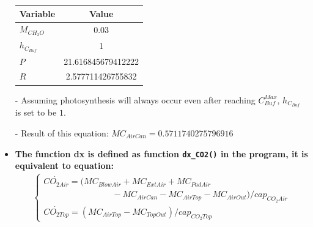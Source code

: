 \documentclass[a4paper]{article}
\numberwithin{equation}{section}
\begin{document}
\begin{itemize}
        \begin{table}[H]
          \centering
          \begin{tabular}{@{}lS[table-format=3.15]@{}}
            \toprule
            \textbf{Variable} & \textbf{Value}     \\
            \midrule
            \(M_{CH_2O}\)     & 0.03               \\
            \(h_{C_{Buf}}\)   & 1                  \\
            \(P\)             & 21.616845679412222 \\
            \(R\)             & 2.577711426755832  \\
            \bottomrule
          \end{tabular}
        \end{table}
  \item[-] Assuming photosynthesis will always occur even after reaching \(C^{Max}_{Buf}\), \(h_{C_{Buf}}\) is set to be \(1\).
  \item[-] Result of this equation: \(MC_{AirCan} = 0.5711740275796916\)

  \item \textbf{The function \textbf{dx} is defined as function \texttt{dx\_CO2()} in the program, it is equivalent to equation:}
        \begin{align*}
          \begin{cases}
            \dot{CO_{2Air}} = (MC_{BlowAir} + MC_{ExtAir} + MC_{PadAir} \\ \qquad \qquad \qquad \qquad
            - MC_{AirCan} - MC_{AirTop} - MC_{AirOut}) / cap_{CO_2Air}  \\
            \dot{CO_{2Top}} = (MC_{AirTop} - MC_{TopOut}) / cap_{CO_2Top}
          \end{cases}
        \end{align*}


\end{itemize}
\end{document}
